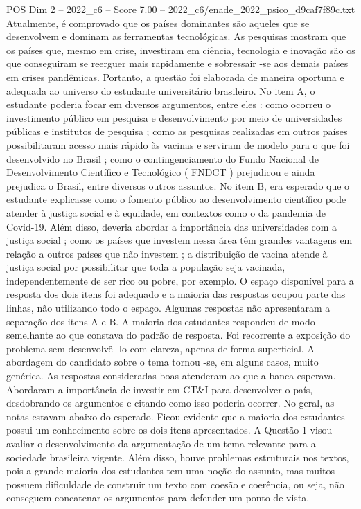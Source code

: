 \begin{textsample}{POS Dim 2 – 2022\_c6 – Score 7.00 – 2022\_c6/enade\_2022\_psico\_d9caf7f89c.txt}
Atualmente, é comprovado que os países dominantes são aqueles que se desenvolvem e dominam as ferramentas tecnológicas.
As pesquisas mostram que os países que, mesmo em crise, investiram em ciência, tecnologia e inovação são os que conseguiram se reerguer mais rapidamente e sobressair -se aos demais países em crises pandêmicas.
Portanto, a questão foi elaborada de maneira oportuna e adequada ao universo do estudante universitário brasileiro.
No item A, o estudante poderia focar em diversos argumentos, entre eles : como ocorreu o investimento público em pesquisa e desenvolvimento por meio de universidades públicas e institutos de pesquisa ; como as pesquisas realizadas em outros países possibilitaram acesso mais rápido às vacinas e serviram de modelo para o que foi desenvolvido no Brasil ; como o contingenciamento do Fundo Nacional de Desenvolvimento Científico e Tecnológico ( FNDCT ) prejudicou e ainda prejudica o Brasil, entre diversos outros assuntos.
No item B, era esperado que o estudante explicasse como o fomento público ao desenvolvimento científico pode atender à justiça social e à equidade, em contextos como o da pandemia de Covid-19.
Além disso, deveria abordar a importância das universidades com a justiça social ; como os países que investem nessa área têm grandes vantagens em relação a outros países que não investem ; a distribuição de vacina atende à justiça social por possibilitar que toda a população seja vacinada, independentemente de ser rico ou pobre, por exemplo.
O espaço disponível para a resposta dos dois itens foi adequado e a maioria das respostas ocupou parte das linhas, não utilizando todo o espaço.
Algumas respostas não apresentaram a separação dos itens A e B.
A maioria dos estudantes respondeu de modo semelhante ao que constava do padrão de resposta.
Foi recorrente a exposição do problema sem desenvolvê -lo com clareza, apenas de forma superficial.
A abordagem do candidato sobre o tema tornou -se, em alguns casos, muito genérica.
As respostas consideradas boas atenderam ao que a banca esperava.
Abordaram a importância de investir em CT\&I para desenvolver o país, desdobrando os argumentos e citando como isso poderia ocorrer.
No geral, as notas estavam abaixo do esperado.
Ficou evidente que a maioria dos estudantes possui um conhecimento sobre os dois itens apresentados.
A Questão 1 visou avaliar o desenvolvimento da argumentação de um tema relevante para a sociedade brasileira vigente.
Além disso, houve problemas estruturais nos textos, pois a grande maioria dos estudantes tem uma noção do assunto, mas muitos possuem dificuldade de construir um texto com coesão e coerência, ou seja, não conseguem concatenar os argumentos para defender um ponto de vista.

\end{textsample}
